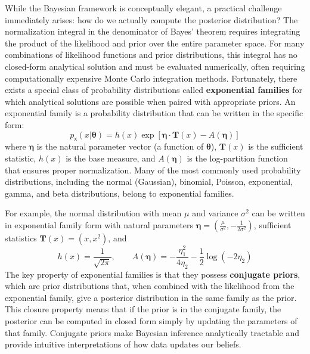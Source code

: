 While the Bayesian framework is conceptually elegant, a practical challenge immediately arises: how do we actually compute the posterior distribution? The normalization integral in the denominator of Bayes' theorem requires integrating the product of the likelihood and prior over the entire parameter space. For many combinations of likelihood functions and prior distributions, this integral has no closed-form analytical solution and must be evaluated numerically, often requiring computationally expensive Monte Carlo integration methods. Fortunately, there exists a special class of probability distributions called \textbf{exponential families} for which analytical solutions are possible when paired with appropriate priors. An exponential family is a probability distribution that can be written in the specific form:
\begin{equation}
    p_{\mathsf{x}}(x|\boldsymbol{\theta}) = h(x) \exp\left[\boldsymbol{\eta} \cdot \mathbf{T}(x) - A(\boldsymbol{\eta})\right]
\end{equation}
where $\boldsymbol{\eta}$ is the natural parameter vector (a function of $\boldsymbol{\theta}$), $\mathbf{T}(x)$ is the sufficient statistic, $h(x)$ is the base measure, and $A(\boldsymbol{\eta})$ is the log-partition function that ensures proper normalization. Many of the most commonly used probability distributions, including the normal (Gaussian), binomial, Poisson, exponential, gamma, and beta distributions, belong to exponential families.

For example, the normal distribution with mean $\mu$ and variance $\sigma^2$ can be written in exponential family form with natural parameters $\boldsymbol{\eta} = \left(\frac{\mu}{\sigma^2}, -\frac{1}{2\sigma^2}\right)$, sufficient statistics $\mathbf{T}(x) = (x, x^2)$, and
\begin{equation}
    h(x) = \frac{1}{\sqrt{2\pi}}, \qquad A(\boldsymbol{\eta}) = -\frac{\eta_1^2}{4\eta_2} - \frac{1}{2}\log(-2\eta_2)
\end{equation}
The key property of exponential families is that they possess \textbf{conjugate priors}, which are prior distributions that, when combined with the likelihood from the exponential family, give a posterior distribution in the same family as the prior. This closure property means that if the prior is in the conjugate family, the posterior can be computed in closed form simply by updating the parameters of that family. Conjugate priors make Bayesian inference analytically tractable and provide intuitive interpretations of how data updates our beliefs.

